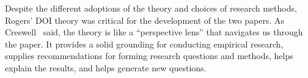\documentclass[journal,12pt,onecolumn,]{IEEEtran}
\begin{document}
Despite the different adoptions of the theory and choices of research methods, Rogers' DOI theory was critical for the development of the two papers.
As Creswell~\cite{creswell2017research} said, the theory is like a ``perspective lens'' that navigates us through the paper. It provides a solid grounding for conducting empirical research, supplies recommendations for forming research questions and methods,
helps explain the results, and helps generate new questions.













\end{document}
